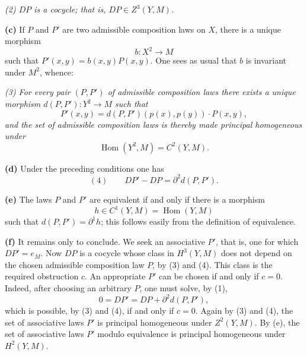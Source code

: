 \smallskip
\noindent\textit{(2) \(DP\) is a cocycle; that is,
\(DP\in Z^3(Y,M)\).}

\smallskip
\noindent\textbf{(c)}
If \(P\) and \(P'\) are two admissible composition laws on \(X\),
there is a unique morphism
\[
 b:X^2\longrightarrow M
\]
such that \(P'(x,y)=b(x,y)P(x,y)\). One sees as usual that \(b\) is
invariant under \(M^2\), whence:

\smallskip
\noindent\textit{(3) For every pair \((P,P')\) of admissible
composition laws there exists a unique morphism
\(d(P,P'):Y^2\to M\) such that}
\[
 P'(x,y)=d(P,P')(p(x),p(y))\cdot P(x,y),
\]
\textit{and the set of admissible composition laws is thereby made
principal homogeneous under}
\[
 \operatorname{Hom}(Y^2,M)=C^2(Y,M).
\]

\smallskip
\noindent\textbf{(d)}
Under the preceding conditions one has
\[
 (4)\qquad DP'-DP=\partial^2d(P,P').
\]

\smallskip
\noindent\textbf{(e)}
The laws \(P\) and \(P'\) are equivalent if and only if there is a
morphism
\[
 h\in C^1(Y,M)=\operatorname{Hom}(Y,M)
\]
such that \(d(P,P')=\partial^1h\); this follows easily from the definition of
equivalence.

\smallskip
\noindent\textbf{(f)}
It remains only to conclude. We seek an associative \(P'\), that is,
one for which \(DP'=e_M\). Now \(DP\) is a cocycle whose class in
\(H^3(Y,M)\) does not depend on the chosen admissible composition law
\(P\), by (3) and (4). This class is the required obstruction \(c\).
An appropriate \(P'\) can be chosen if and only if \(c=0\). Indeed,
after choosing an arbitrary \(P\), one must solve, by (1),
\[
 0=DP'=DP+\partial^2d(P,P'),
\]
which is possible, by (3) and (4), if and only if \(c=0\). Again by
(3) and (4), the set of associative laws \(P'\) is principal
homogeneous under \(Z^2(Y,M)\). By (e), the set of associative laws
\(P'\) modulo equivalence is principal homogeneous under
\(H^2(Y,M)\).

